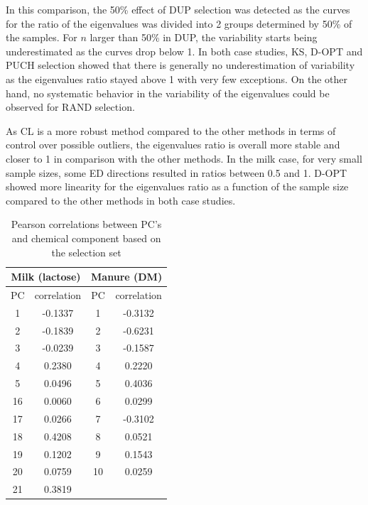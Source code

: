 \documentclass[journal=ancham,manuscript=article]{achemso}
\begin{document}
In this comparison, the 50\% effect of DUP selection was detected as the curves for the ratio of the eigenvalues was divided into 2 groups determined by 50\% of the samples. For $n$ larger than 50\% in DUP, the variability starts being underestimated as the curves drop below 1. In both case studies, KS, D-OPT and PUCH selection showed that there is generally no underestimation of variability as the eigenvalues ratio stayed above 1 with very few exceptions. On the other hand, no systematic behavior in the variability of the eigenvalues could be observed for RAND selection. 

As CL is a more robust method compared to the other methods in terms of control over possible outliers, the eigenvalues ratio is overall more stable and closer to 1 in comparison with the other methods. In the milk case, for very small sample sizes, some ED directions resulted in ratios between 0.5 and 1. D-OPT showed more linearity for the eigenvalues ratio as a function of the sample size compared to the other methods in both case studies. 

\begin{table}[t]
\centering
\begin{tabular}{|cc|cc|} 
\hline
\multicolumn{2}{|c|}{Milk (lactose)} & \multicolumn{2}{|c|}{Manure (DM)}\\
\hline
PC	& correlation	&  PC & correlation	\\
\hline
  1 & -0.1337 & 1 & -0.3132 \\
  2 & -0.1839 & 2 & -0.6231 \\
  3 & -0.0239 & 3 & -0.1587 \\
  4 &  0.2380 & 4 &  0.2220 \\
  5 &  0.0496 & 5 &  0.4036 \\
 16 &  0.0060 & 6 &  0.0299 \\
 17 &  0.0266 & 7 & -0.3102 \\
 18 &  0.4208 & 8 & 0.0521 \\
 19 &  0.1202 & 9 & 0.1543 \\
 20 &  0.0759 & 10& 0.0259 \\
 21 &  0.3819 &  & \\
 \hline
\end{tabular}
\caption{Pearson correlations between PC's and chemical component based on the selection set}
\label{tab_correlations}
\end{table}
\end{document}
